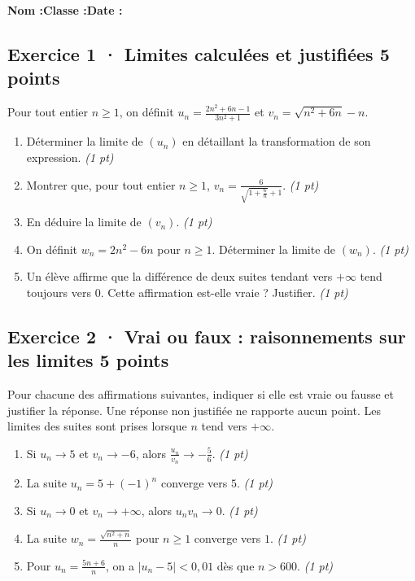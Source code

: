 \smallskip\textbf{Nom :}\enspace\dotfill\quad\textbf{Classe :}\enspace\dotfill\quad\textbf{Date :}\enspace\dotfill

\subsection*{Exercice 1 · Limites calculées et justifiées \hfill 5 points}Pour tout entier $n\ge1$, on définit $u_n=\frac{2n^2+6n-1}{3n^2+1}$ et $v_n=\sqrt{n^2+6n}-n$.

\begin{enumerate}

\item Déterminer la limite de $(u_n)$ en détaillant la transformation de son expression. \hfill\textit{(1 pt)}

\item Montrer que, pour tout entier $n\ge1$, $v_n=\frac{6}{\sqrt{1+\frac{6}n}+1}$. \hfill\textit{(1 pt)}

\item En déduire la limite de $(v_n)$. \hfill\textit{(1 pt)}

\item On définit $w_n=2n^2-6n$ pour $n\ge1$. Déterminer la limite de $(w_n)$. \hfill\textit{(1 pt)}

\item Un élève affirme que la différence de deux suites tendant vers $+\infty$ tend toujours vers $0$. Cette affirmation est-elle vraie ? Justifier. \hfill\textit{(1 pt)}

\end{enumerate}

\subsection*{Exercice 2 · Vrai ou faux : raisonnements sur les limites \hfill 5 points}Pour chacune des affirmations suivantes, indiquer si elle est vraie ou fausse et justifier la réponse. Une réponse non justifiée ne rapporte aucun point. Les limites des suites sont prises lorsque $n$ tend vers $+\infty$.

\begin{enumerate}

\item Si $u_n\to 5$ et $v_n\to-6$, alors $\frac{u_n}{v_n}\to-\frac{5}{6}$. \hfill\textit{(1 pt)}

\item La suite $u_n=5+(-1)^n$ converge vers $5$. \hfill\textit{(1 pt)}

\item Si $u_n\to0$ et $v_n\to+\infty$, alors $u_nv_n\to0$. \hfill\textit{(1 pt)}

\item La suite $w_n=\frac{\sqrt{n^2+n}}{n}$ pour $n\ge1$ converge vers $1$. \hfill\textit{(1 pt)}

\item Pour $u_n=\frac{5n+6}{n}$, on a $|u_n-5|<0{,}01$ dès que $n> 600$. \hfill\textit{(1 pt)}

\end{enumerate}

